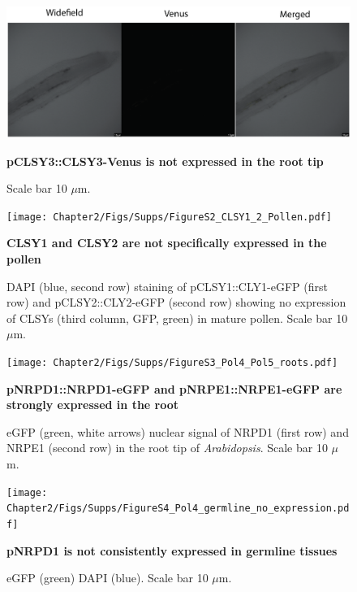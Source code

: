 
\begin{figure}[htbp!] 
\centering    
    \includegraphics[width=1\textwidth]{Chapter2/Figs/Supps/FigureS1_CLSY3_Root_tip_neg.pdf}
\caption{\textbf{pCLSY3::CLSY3-Venus is not expressed in the root tip}}
\label{fig:clsy3_root}
\captionsetup{font=small}
    \caption*{Scale bar 10 $\mu$m.}
\end{figure}

\begin{figure}[htbp!] 
\centering    
    \texttt{[image: Chapter2/Figs/Supps/FigureS2\_CLSY1\_2\_Pollen.pdf]}
\caption{\textbf{CLSY1 and CLSY2 are not specifically expressed in the pollen}}
\label{fig:clsy1_2_pollen}
\captionsetup{font=small}
    \caption*{DAPI (blue, second row) staining of pCLSY1::CLY1-eGFP (first row) and pCLSY2::CLY2-eGFP (second row) showing no expression of CLSYs (third column, GFP, green) in mature pollen. Scale bar 10 $\mu$m.}
\end{figure}

\begin{figure}[htbp!] 
\centering    
    \texttt{[image: Chapter2/Figs/Supps/FigureS3\_Pol4\_Pol5\_roots.pdf]}
\caption{\textbf{pNRPD1::NRPD1-eGFP and pNRPE1::NRPE1-eGFP are strongly expressed in the root}}
\label{fig:Pol4_5_roots}
\captionsetup{font=small}
    \caption*{eGFP (green, white arrows) nuclear signal of NRPD1 (first row) and NRPE1 (second row) in the root tip of \textit{Arabidopsis}. Scale bar 10 $\mu$m.}
\end{figure}

\begin{figure}[htbp!] 
\centering    
    \texttt{[image: Chapter2/Figs/Supps/FigureS4\_Pol4\_germline\_no\_expression.pdf]}
\caption{\textbf{pNRPD1 is not consistently expressed in germline tissues}}
\label{fig:Pol4_germ_no_expression}
\captionsetup{font=small}
    \caption*{eGFP (green) DAPI (blue). Scale bar 10 $\mu$m.}
\end{figure}

